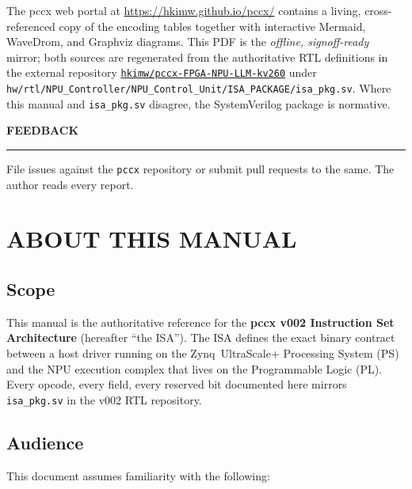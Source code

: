 \documentclass[11pt,a4paper,twoside,openany]{report}
\newcommand{\RefSection}[1]{%
  \par\medskip
  {\sffamily\bfseries\color{oceanblue}\normalsize\MakeUppercase{#1}}
  \par\vspace{-0.4em}
  {\color{oceanblue}\rule{\linewidth}{0.4pt}}\par\smallskip
}
\begin{document}
The pccx web portal at \url{https://hkimw.github.io/pccx/}
contains a living, cross-referenced copy of the encoding tables
together with interactive Mermaid, WaveDrom, and Graphviz diagrams.
This PDF is the \textit{offline, signoff-ready} mirror; both sources
are regenerated from the authoritative RTL definitions in the external
repository
\href{https://github.com/hkimw/pccx-FPGA-NPU-LLM-kv260}{\texttt{hkimw/pccx-FPGA-NPU-LLM-kv260}}
under
\texttt{hw/rtl/NPU\_Controller/NPU\_Control\_Unit/ISA\_PACKAGE/isa\_pkg.sv}.
Where this manual and \texttt{isa\_pkg.sv} disagree, the SystemVerilog
package is normative.

\RefSection{Feedback}

File issues against the \texttt{pccx} repository or submit pull
requests to the same. The author reads every report.

\newpage

\tableofcontents
\clearpage
\listoffigures
\clearpage

\setcounter{chapter}{0}

\chapter{ABOUT THIS MANUAL}

\section{Scope}

This manual is the authoritative reference for the \textbf{pccx v002
Instruction Set Architecture} (hereafter ``the ISA''). The ISA defines
the exact binary contract between a host driver running on the
Zynq~UltraScale+ Processing System (PS) and the NPU execution complex
that lives on the Programmable Logic (PL). Every opcode, every field,
every reserved bit documented here mirrors
\texttt{isa\_pkg.sv} in the v002 RTL repository.

\section{Audience}

This document assumes familiarity with the following:
\end{document}
